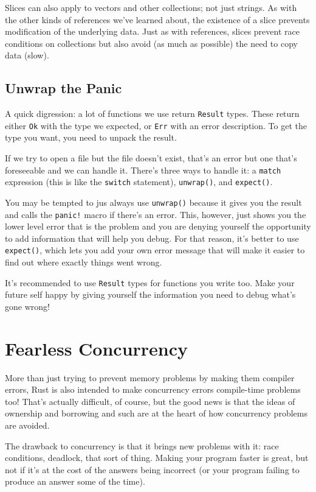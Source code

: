 \documentclass[a4paper]{report}
\begin{document}
Slices can also apply to vectors and other collections; not just strings. As with the other kinds of references we've learned about, the existence of a slice prevents modification of the underlying data. Just as with references, slices prevent race conditions on collections but also avoid (as much as possible) the need to copy data (slow).

\subsection*{Unwrap the Panic}
A quick digression: a lot of functions we use return \texttt{Result} types. These return either \texttt{Ok} with the type we expected, or \texttt{Err} with an error description. To get the type you want, you need to unpack the result.

If we try to open a file but the file doesn't exist, that's an error but one that's foreseeable and we can handle it. There's three ways to handle it: a \texttt{match} expression (this is like the \texttt{switch} statement), \texttt{unwrap()}, and \texttt{expect()}. 

You may be tempted to jus always use \texttt{unwrap()} because it gives you the result and calls the \texttt{panic!} macro if there's an error. This, however, just shows you the lower level error that is the problem and you are denying yourself the opportunity to add information that will help you debug. For that reason, it's better to use \texttt{expect()}, which lets you add your own error message that will make it easier to find out where exactly things went wrong.

It's recommended to use \texttt{Result} types for functions you write too. Make your future self happy by giving yourself the information you need to debug what's gone wrong!

\section*{Fearless Concurrency}
More than just trying to prevent memory problems by making them compiler errors, Rust is also intended to make concurrency errors compile-time problems too! That's actually difficult, of course, but the good news is that the ideas of ownership and borrowing and such are at the heart of how concurrency problems are avoided.

The drawback to concurrency is that it brings new problems with it: race conditions, deadlock, that sort of thing. Making your program faster is great, but not if it's at the cost of the answers being incorrect (or your program failing to produce an answer some of the time).
\end{document}
